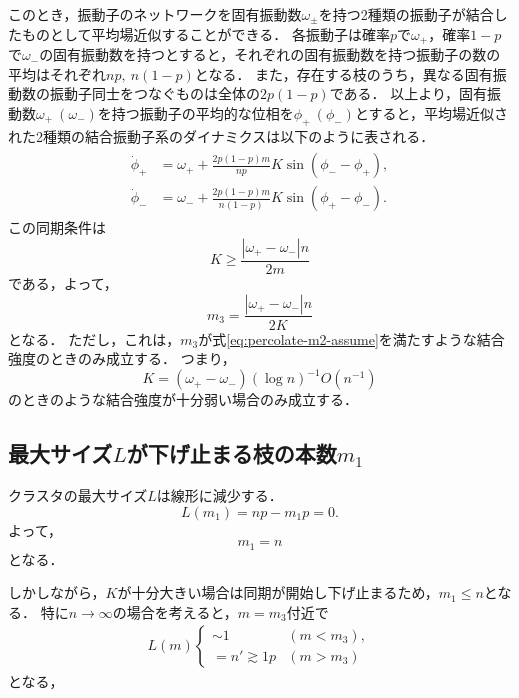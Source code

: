 \documentclass[../main]{subfiles}
\begin{document}
このとき，振動子のネットワークを固有振動数$\omega_\pm$を持つ2種類の振動子が結合したものとして平均場近似することができる．
各振動子は確率$p$で$\omega_+$，確率$1-p$で$\omega_-$の固有振動数を持つとすると，それぞれの固有振動数を持つ振動子の数の平均はそれぞれ$np,\ n(1-p)$となる．
また，存在する枝のうち，異なる固有振動数の振動子同士をつなぐものは全体の$2p(1-p)$である．
以上より，固有振動数$\omega_+\ (\omega_-)$を持つ振動子の平均的な位相を$\phi_+\ (\phi_-)$とすると，平均場近似された2種類の結合振動子系のダイナミクスは以下のように表される．
\begin{align}
    \begin{split}
        \dot{\phi}_+&=\omega_++\frac{2p(1-p)m}{np}K\sin(\phi_--\phi_+),\\
        \dot{\phi}_-&=\omega_-+\frac{2p(1-p)m}{n(1-p)}K\sin(\phi_+-\phi_-).
    \end{split}
\end{align}
この同期条件は
\begin{equation*}
    K\geq \frac{|\omega_+-\omega_-|n}{2m}
\end{equation*}
である，よって，
\begin{equation}
    \label{eq:percolate-m3}
    m_3=\frac{|\omega_+-\omega_-|n}{2K}
\end{equation}
となる．
ただし，これは，$m_3$が式\eqref{eq:percolate-m2-assume}を満たすような結合強度のときのみ成立する．
つまり，
\begin{equation}
    \label{eq:er-meanfield-k}
    K=(\omega_+-\omega_-)(\log n)^{-1}O(n^{-1})
\end{equation}
のときのような結合強度が十分弱い場合のみ成立する．
\subsection{最大サイズ$L$が下げ止まる枝の本数$m_1$}
\label{sec:percolate-m1}
クラスタの最大サイズ$L$は線形に減少する．
\begin{equation}
    L(m_1)=np-m_1p=0.
\end{equation}
よって，
\begin{equation}
    m_1=n
\end{equation}
となる．

しかしながら，$K$が十分大きい場合は同期が開始し下げ止まるため，$m_1\leq n$となる．
特に$n\to\infty$の場合を考えると，$m=m_3$付近で
\begin{align}
    L(m)
    \begin{cases}
        \sim 1&(m<m_3),\\        
        =n'\gtrsim  1p&(m> m_3)        
    \end{cases}
\end{align}
となる，
\end{document}
